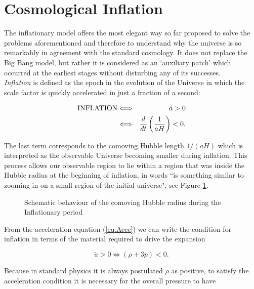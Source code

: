\documentclass{rmaa}
\def\beq{\begin{equation}}
\def\eeq{\end{equation}}
\def\bea{\begin{eqnarray}}
\def\eea{\end{eqnarray}}
\begin{document}
\section{Cosmological Inflation}
\vskip 6pt

The inflationary model offers the most elegant way so far proposed to solve the problems
aforementioned and therefore to understand why the universe is so remarkably in agreement 
with the standard cosmology. It does not replace the Big Bang model, but rather it is considered 
as an `auxiliary patch' which occurred at the earliest stages without disturbing any of its successes.
\\

\textit{Inflation} is defined as the epoch in the evolution of the Universe in which the scale factor 
is quickly accelerated in just a fraction of a second:

\bea \label{eq:inflation}
{\rm INFLATION} &\Longleftrightarrow&~~\ddot a>0 \\
&\Longleftrightarrow& \frac{d}{dt}\left( \frac{{1}}{aH}\right)<0. \label{eq:inflation2}
\eea

\noindent
The last term corresponds to the comoving Hubble length 
$1/(aH)$ which is interpreted as the observable 
Universe becoming smaller during inflation. This process allows our observable
region to lie within a region that was inside the Hubble radius at the beginning of inflation, 
in \citet{Liddle2} words ``is something
similar to zooming in on a small region of the initial universe", see
Figure \ref{fig:Liddle}.
\\

\begin{figure}[ht] 
\centerline{ \epsfxsize=180pt  }
\caption{Schematic behaviour 
of the comoving Hubble radius during the Inflationary period}%
\label{fig:Liddle}
\end{figure}

From the acceleration equation (\ref{eq:Acce}) we can write the condition for inflation in 
terms of the material required to drive the expansion

\beq
\ddot a>0 \Longleftrightarrow (\rho +3p)<0.
\label{gg}
\eeq

\noindent
Because in standard physics it is always postulated $\rho$ as positive, 
to satisfy the acceleration condition it is necessary for the overall pressure to have 
\end{document}
